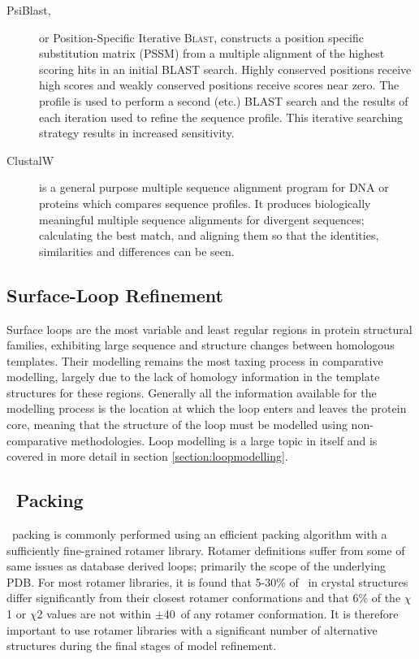 \begin{description}

\item[PsiBlast\cite{SEQUENCE:PSIBLAST},] or Position-Specific Iterative \textsc{Blast}, constructs a position specific substitution matrix (PSSM) from a multiple alignment of the highest scoring hits in an initial BLAST search. Highly conserved positions receive high scores and weakly conserved positions receive scores near zero. The profile is used to perform a second (etc.) BLAST search and the results of each iteration used to refine the sequence profile. This iterative searching strategy results in increased sensitivity.

\item[ClustalW\cite{SEQUENCE:CLUSTALW}] is a general purpose multiple sequence alignment program for DNA or proteins which compares sequence profiles. It produces biologically meaningful multiple sequence alignments for divergent sequences; calculating the best match, and aligning them so that the identities, similarities and differences can be seen.

\end{description}




\subsection{Surface-Loop Refinement}

Surface loops are the most variable and least regular regions in protein structural families, exhibiting large sequence and structure changes between
homologous templates. Their modelling remains the most taxing process in comparative modelling, largely due to the lack of homology information in the template structures for these regions\cite{METHOD:CASP6:CM}. Generally all the information available for the modelling process is the location at which the loop enters and leaves the protein core, meaning that the structure of the loop must be modelled using non-comparative methodologies. Loop modelling is a large topic in itself and is covered in more detail in section \ref{section:loopmodelling}.



\subsection{\Sidechain\ Packing}

\Sidechain\ packing is commonly performed using an efficient packing algorithm
with a sufficiently fine-grained rotamer library. Rotamer definitions suffer from some of same issues as database derived loops;
primarily the scope of the underlying PDB. For most rotamer libraries, it is found that 5-30\% of \sidechains\ in crystal structures differ significantly from their closest rotamer conformations and that 6\% of the $\chi$1 or $\chi$2 values are not within $\pm$40\degree\ of any rotamer conformation. It is
therefore important to use rotamer libraries with a significant number of
alternative structures during the final stages of model refinement.




